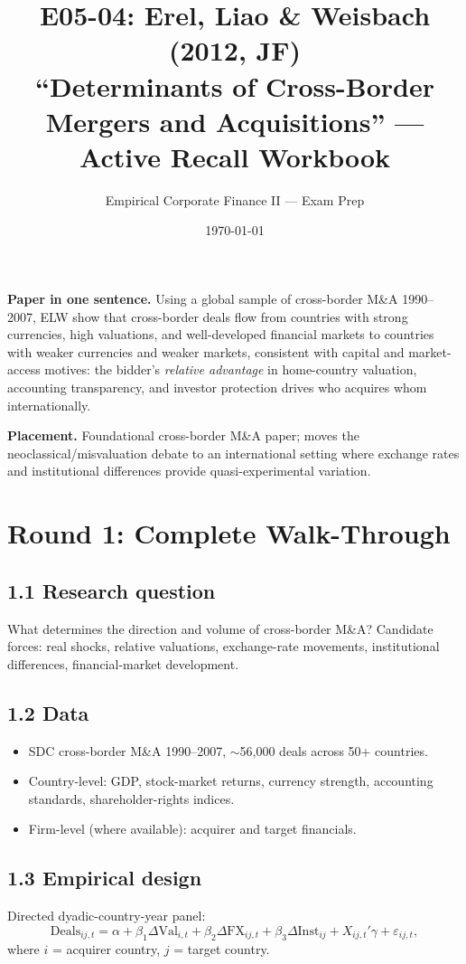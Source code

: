 \documentclass[11pt]{article}
\title{E05-04: Erel, Liao \& Weisbach (2012, JF) \\
\large ``Determinants of Cross-Border Mergers and Acquisitions'' --- Active Recall Workbook}
\author{Empirical Corporate Finance II --- Exam Prep}
\date{\today}
\begin{document}
\maketitle

\begin{keybox}
\textbf{Paper in one sentence.} Using a global sample of cross-border M\&A 1990--2007, ELW show that cross-border deals flow from countries with strong currencies, high valuations, and well-developed financial markets to countries with weaker currencies and weaker markets, consistent with capital and market-access motives: the bidder's \emph{relative advantage} in home-country valuation, accounting transparency, and investor protection drives who acquires whom internationally.

\textbf{Placement.} Foundational cross-border M\&A paper; moves the neoclassical/misvaluation debate to an international setting where exchange rates and institutional differences provide quasi-experimental variation.
\end{keybox}

\section*{Round 1: Complete Walk-Through}

\subsection*{1.1 Research question}
What determines the direction and volume of cross-border M\&A? Candidate forces: real shocks, relative valuations, exchange-rate movements, institutional differences, financial-market development.

\subsection*{1.2 Data}
\begin{itemize}
\item SDC cross-border M\&A 1990--2007, $\sim$56,000 deals across 50+ countries.
\item Country-level: GDP, stock-market returns, currency strength, accounting standards, shareholder-rights indices.
\item Firm-level (where available): acquirer and target financials.
\end{itemize}

\subsection*{1.3 Empirical design}
Directed dyadic-country-year panel:
\[
\text{Deals}_{ij,t}=\alpha+\beta_1\Delta\text{Val}_{i,t}+\beta_2\Delta\text{FX}_{ij,t}+\beta_3\Delta\text{Inst}_{ij}+X_{ij,t}'\gamma+\varepsilon_{ij,t},
\]
where $i$ = acquirer country, $j$ = target country.
\end{document}
